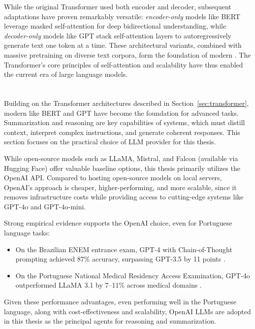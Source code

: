 While the original Transformer used both encoder and decoder, subsequent adaptations have proven remarkably versatile: \textit{encoder-only} models like \gls{BERT} leverage masked self-attention for deep bidirectional understanding, while \textit{decoder-only} models like \gls{GPT} stack self-attention layers to autoregressively generate text one token at a time. These architectural variants, combined with massive pretraining on diverse text corpora, form the foundation of modern . The Transformer's core principles of self-attention and scalability have thus enabled the current era of large language models.

\section{}
\label{sec:llm}
Building on the Transformer architectures described in Section~\ref{sec:transformer}, modern  like \gls{BERT} and \gls{GPT} have become the foundation for advanced  tasks. Summarization and reasoning are key capabilities of  systems, which must distill context, interpret complex instructions, and generate coherent responses. This section focuses on the practical choice of \gls{LLM} provider for this thesis.

While open-source models such as LLaMA, Mistral, and Falcon (available via Hugging Face) offer valuable baseline options, this thesis primarily utilizes the OpenAI API. Compared to hosting open-source models on local servers, OpenAI's approach is cheaper, higher-performing, and more scalable, since it removes infrastructure costs while providing access to cutting-edge systems like \gls{GPT}-4o and \gls{GPT}-4o-mini.

Strong empirical evidence supports the OpenAI choice, even for Portuguese language tasks:
\begin{itemize}
  \item On the Brazilian ENEM entrance exam, \gls{GPT}-4 with Chain-of-Thought prompting achieved 87\% accuracy, surpassing \gls{GPT}-3.5 by 11 points \cite{arxiv2303.17003}.
  \item On the Portuguese National Medical Residency Access Examination, \gls{GPT}-4o outperformed LLaMA 3.1 by 7–11\% across medical domains \cite{pmc12166901}.
\end{itemize}

Given these performance advantages, even performing well in the Portuguese language, along with cost-effectiveness and scalability, OpenAI \glspl{LLM} are adopted in this thesis as the principal agents for reasoning and summarization.


